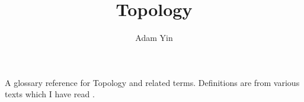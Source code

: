 \documentclass[a4paper]{article}
\title{Topology}
\author{Adam Yin}
\date{}
\begin{document}
\maketitle
A glossary reference for Topology and related terms. Definitions are from various texts which I have read \cite{general_topology}.

\clearpage

\glsaddall
{}
\printglossaries

\medskip



\end{document}
